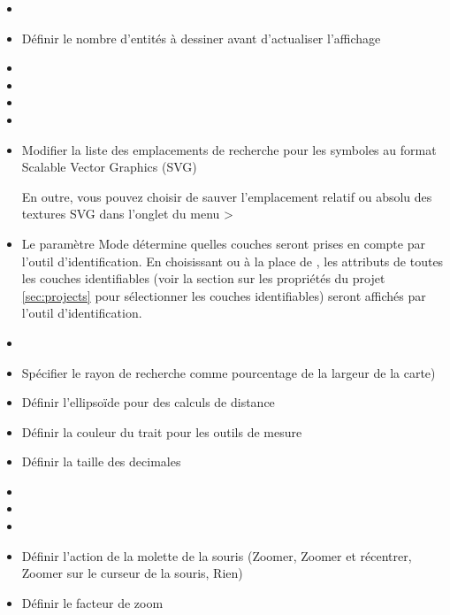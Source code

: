 
\begin{itemize}[label=--]
\item {}
\item Définir le nombre d'entités à dessiner avant d'actualiser l'affichage
\item {}
\item {}
\item {}
\item {}
\item Modifier la liste des emplacements de recherche pour les symboles au format Scalable Vector Graphics (SVG)

En outre, vous pouvez choisir de sauver l'emplacement relatif ou absolu des textures 
SVG dans l'onglet  du menu  > 
\end{itemize}


\begin{itemize}[label=--]
\item Le paramètre Mode détermine quelles couches seront prises en compte par l'outil 
d'identification. En choisissant  ou  à la place de , les attributs 
de toutes les couches identifiables (voir la section sur les propriétés du projet 
\ref{sec:projects} pour sélectionner les couches identifiables) seront affichés par 
l'outil d'identification.
\item {}
\item Spécifier le rayon de recherche comme pourcentage de la largeur de la carte)
\item Définir l'ellipsoïde pour des calculs de distance
\item Définir la couleur du trait pour les outils de mesure
\item Définir la taille des decimales
\item {}
\item {}
\item {}
\item Définir l'action de la molette de la souris (Zoomer, Zoomer et récentrer, Zoomer sur le curseur de la souris, Rien)
\item Définir le facteur de zoom
\end{itemize}

